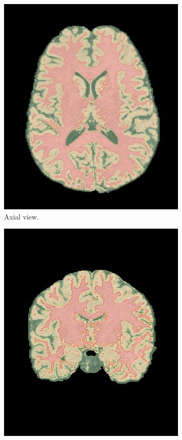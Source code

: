 \documentclass{standalone}
\begin{document}
\begin{figure}[h!]
		\centering
        \begin{subfigure}[b]{0.325\textwidth}
             \includegraphics[scale=0.1046]{img/Chap2/segmented_axial.jpg}
             \caption{Axial view.}
        \end{subfigure}
        \hfill
        \begin{subfigure}[b]{0.325\textwidth}
             \includegraphics[scale=0.21]{img/Chap3/segmented_frontal.png}

\end{subfigure}
\end{figure}
\end{document}
